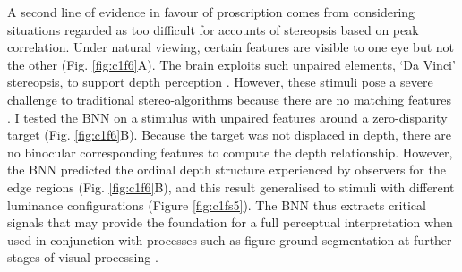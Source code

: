 {A second line of evidence in favour of proscription comes from considering situations regarded as too difficult for accounts of stereopsis based on peak correlation. Under natural viewing, certain features are visible to one eye but not the other (Fig. \ref{fig:c1f6}A). The brain exploits such unpaired elements, `Da Vinci' stereopsis, to support depth perception \cite{Gillam:1988lo, Nakayama:1990fc}. However, these stimuli pose a severe challenge to traditional stereo-algorithms because there are no matching features \cite{Anderson:1994tp}. I tested the BNN on a stimulus with unpaired features around a zero-disparity target (Fig. \ref{fig:c1f6}B). Because the target was not displaced in depth, there are no binocular corresponding features to compute the depth relationship. However, the BNN predicted the ordinal depth structure experienced by observers for the edge regions (Fig. \ref{fig:c1f6}B), and this result generalised to stimuli with different luminance configurations (Figure \ref{fig:c1fs5}). The BNN thus extracts critical signals that may provide the foundation for a full perceptual interpretation when used in conjunction with processes such as figure-ground segmentation at further stages of visual processing \cite{Ban:2015cr, Tsirlin2014}.

}
